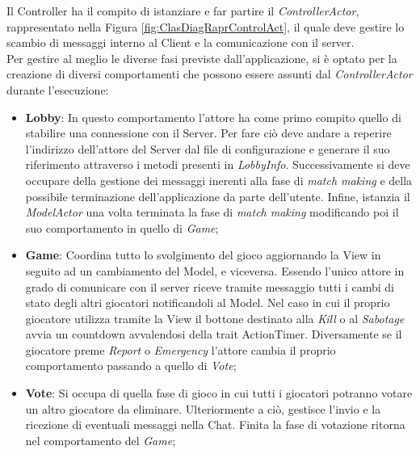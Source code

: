 Il Controller ha il compito di istanziare e far partire il \textit{ControllerActor}, rappresentato nella Figura \ref{fig:ClasDiagRaprControlAct}, il quale deve gestire lo scambio di messaggi interno al Client e la comunicazione con il server.\\
Per gestire al meglio le diverse fasi previste dall'applicazione, si \`e optato per la creazione di diversi comportamenti che possono essere assunti dal \textit{ControllerActor} durante l'esecuzione:
\begin{itemize}
    \item \textbf{Lobby}: In questo comportamento l’attore ha come primo compito quello di stabilire una connessione con il Server. Per fare ci\`o deve andare a reperire l'indirizzo dell'attore del Server dal file di configurazione e generare il suo riferimento attraverso i metodi presenti in \textit{LobbyInfo}. Successivamente si deve occupare della gestione dei messaggi inerenti alla fase di \textit{match making} e della possibile terminazione dell'applicazione da parte dell'utente. Infine, istanzia il \textit{ModelActor} una volta terminata la fase di \textit{match making} modificando poi il suo comportamento in quello di \textit{Game};
    \item \textbf{Game}: Coordina tutto lo svolgimento del gioco aggiornando la View in seguito ad un cambiamento del Model, e viceversa. Essendo l’unico attore in grado di comunicare con il server riceve tramite messaggio tutti i cambi di stato degli altri giocatori notificandoli al Model. Nel caso in cui il proprio giocatore utilizza tramite la View il bottone destinato alla \textit{Kill} o al \textit{Sabotage} avvia un countdown avvalendosi della trait ActionTimer. Diversamente se il giocatore preme \textit{Report} o \textit{Emergency} l'attore cambia il proprio comportamento passando a quello di \textit{Vote};
    \item \textbf{Vote}: Si occupa di quella fase di gioco in cui tutti i giocatori potranno votare un altro giocatore da eliminare. Ulteriormente a ci\`o, gestisce l'invio e la ricezione di eventuali messaggi nella Chat. Finita la fase di votazione ritorna nel comportamento del \textit{Game};
\end{itemize}

